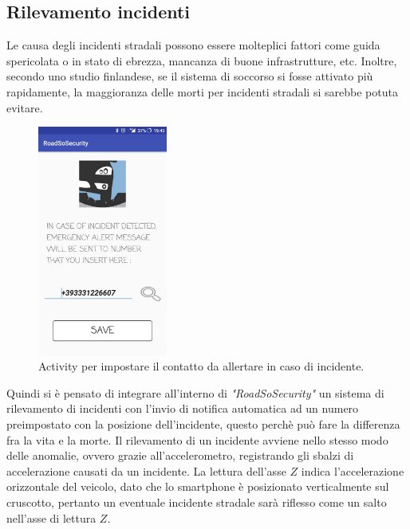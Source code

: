 \documentclass[a4paper, 11pt]{article} %
\begin{document}
\subsection*{Rilevamento incidenti \cite{Faiz2016}}
Le causa degli incidenti stradali possono essere molteplici fattori come guida spericolata o in stato di ebrezza, mancanza di buone infrastrutture, etc. Inoltre, secondo uno studio finlandese, se il sistema di soccorso si fosse attivato più rapidamente, la maggioranza delle morti per incidenti stradali si sarebbe potuta evitare.
\begin{figure} %
	\begin{center}
		\includegraphics[width=0.38\textwidth]{images/numberActivity.jpg}
	\end{center}
	\caption{Activity per impostare il contatto da allertare in caso di incidente.}
	\label{fig:numberAnomaly}
\end{figure}
Quindi si è pensato di integrare all'interno di \textit{"RoadSoSecurity"} un sistema di rilevamento di incidenti con l'invio di notifica automatica ad un numero preimpostato con la posizione dell’incidente, questo perchè può fare la differenza fra la vita e la morte. Il rilevamento di un incidente avviene nello stesso modo delle anomalie, ovvero grazie all'accelerometro, registrando gli sbalzi di accelerazione causati da un incidente. La lettura dell'asse $Z$ indica l'accelerazione orizzontale del veicolo, dato che lo smartphone è posizionato verticalmente sul cruscotto, pertanto un eventuale incidente stradale sarà riflesso come un salto nell'asse di lettura $Z$. 
\end{document}
